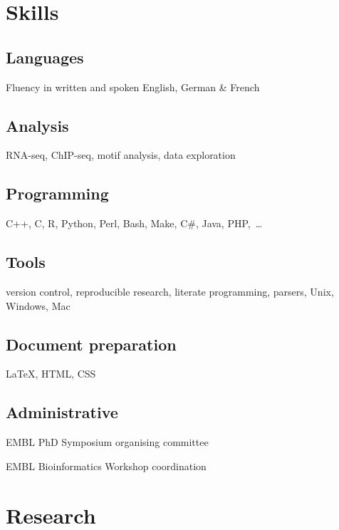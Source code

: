 \documentclass{klmr-cv}
\newcommand*\csharp{C\#}
\newcommand*\cpp{C++}
\begin{document}
\section{Skills}

\subsection{Languages}

\item{Fluency in written and spoken English, German \& French}

\subsection{Analysis}

\item{RNA-seq, ChIP-seq, motif analysis, data exploration}

\subsection{Programming}

\item{\cpp, C, R, Python, Perl, Bash, Make, \csharp, Java, PHP,~…}

\subsection{Tools}

\item{version control, reproducible research, literate programming, parsers,
    Unix, Windows, Mac}

\subsection{Document preparation}

\item{\LaTeX, HTML, CSS}

\subsection{Administrative}

\item{EMBL PhD Symposium organising committee}
\item{EMBL Bioinformatics Workshop coordination}

\body

\section{Research}
\end{document}
